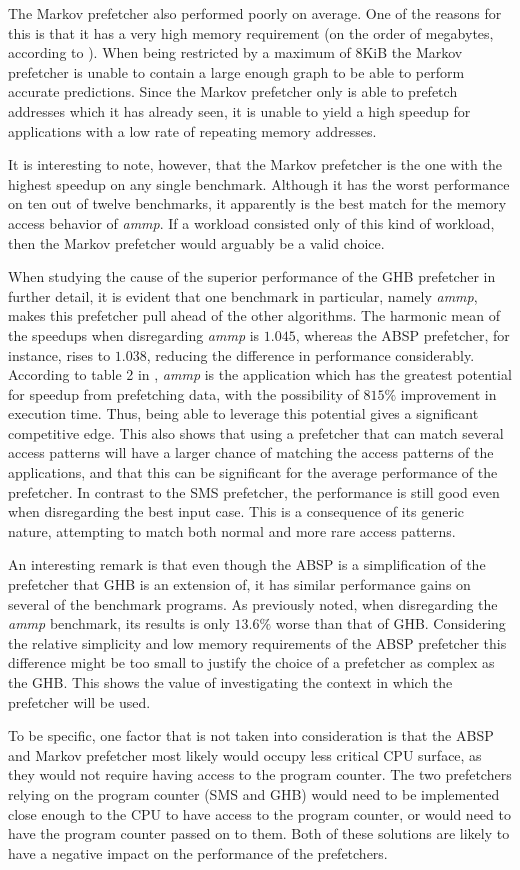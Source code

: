 The Markov prefetcher also performed poorly on average. One of the
reasons for this is that it has a very high memory requirement (on the
order of megabytes, according to \cite{Nesbit}). When being restricted
by a maximum of 8KiB the Markov prefetcher is unable to contain a
large enough graph to be able to perform accurate predictions. Since
the Markov prefetcher only is able to prefetch addresses which it has
already seen, it is unable to yield a high speedup for applications
with a low rate of repeating memory addresses.

It is interesting to note, however, that the Markov prefetcher is the
one with the highest speedup on any single benchmark. Although it has
the worst performance on ten out of twelve benchmarks, it apparently
is the best match for the memory access behavior of \emph{ammp}. If a
workload consisted only of this kind of workload, then the Markov
prefetcher would arguably be a valid choice.

When studying the cause of the superior performance of the GHB
prefetcher in further detail, it is evident that one benchmark in
particular, namely \emph{ammp}, makes this prefetcher pull ahead of
the other algorithms. The harmonic mean of the speedups when
disregarding \emph{ammp} is $1.045$, whereas the ABSP prefetcher, for
instance, rises to $1.038$, reducing the difference in performance
considerably. According to table 2 in \cite{Nesbit}, \emph{ammp} is
the application which has the greatest potential for speedup from
prefetching data, with the possibility of $815\%$ improvement in
execution time. Thus, being able to leverage this potential gives a
significant competitive edge. This also shows that using a prefetcher
that can match several access patterns will have a larger chance of
matching the access patterns of the applications, and that this can be
significant for the average performance of the prefetcher. In contrast
to the SMS prefetcher, the performance is still good even when
disregarding the best input case. This is a consequence of its generic
nature, attempting to match both normal and more rare access patterns.

An interesting remark is that even though the ABSP is a simplification
of the prefetcher that GHB is an extension of, it has similar
performance gains on several of the benchmark programs. As previously
noted, when disregarding the \emph{ammp} benchmark, its results is
only $13.6\%$ worse than that of GHB. Considering the relative
simplicity and low memory requirements of the ABSP prefetcher this
difference might be too small to justify the choice of a prefetcher as
complex as the GHB. This shows the value of investigating the context
in which the prefetcher will be used.

To be specific, one factor that is not taken into consideration is
that the ABSP and Markov prefetcher most likely would occupy less
critical CPU surface, as they would not require having access to the
program counter. The two prefetchers relying on the program counter
(SMS and GHB) would need to be implemented close enough to the CPU to
have access to the program counter, or would need to have the program
counter passed on to them. Both of these solutions are likely to have
a negative impact on the performance of the prefetchers.

